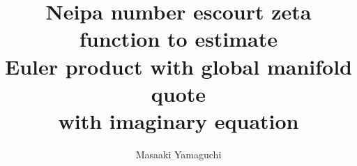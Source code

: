 \documentclass{jsarticle}
\begin{document}
\title{Neipa number escourt zeta function to estimate \\
Euler product with global manifold quote \\
with imaginary equation }
\author{Masaaki Yamaguchi}
\date{}
\maketitle

  \newcommand{\variint}{%
	\begin{picture}(15,30)
		\put(0,0){
			$ \iint $}
		\put(0,5){\line(15,0){15}}
	\end{picture} %
}

\newcommand{\variiint}{%
	\begin{picture}(15,15)
		\put(0,0){
			$ \iiint $}
		\put(0,5){\line(15,0){20}}
	\end{picture} %
}



 \newcommand{\alearletter}{%
	 \begin{picture}(10,20)
		 \put(0,0){
			 $ \square $}
		 \put(0,0){\line(1,1){10}}
	 \end{picture} %
	 }

 \newcommand{\secproduct}{%
	 \begin{picture}(10,20)
		 \put(0,0){
			 $ \nabla $}
		 \put(5,0){+}
	 \end{picture} %
	 }
 \newcommand{\talot}{%
	 \begin{picture}(15,20)
		 \put(0,0){
			 $ \text{\scalebox{2.0}[2]{$\nabla$}}$}
		 \put(5,3){
			 $ \Delta $}
	 \end{picture} %
	 }
 \newcommand{\hazerdnabla}{%
	 \begin{picture}(15,20)
		 \put(0,0){
			 $ \text{\scalebox{2.0}[2]{$\nabla$}}$}
		 \put(5,3){
			 $\text{Y}  $}
	 \end{picture} %
	 }

 \newcommand{\securebox}{%
	 \begin{picture}(15,20)
		 \put(0,0){
			 $ \text{\scalebox{2.0}[2]{$\square$}}$}
		 \put(5,3){
			 $\text{Y}  $}
	 \end{picture} %
	 }


\newcommand{\timebow}{%
	\begin{picture}(5,5)
		\put(0,0){$\text{\rotatebox{90}{$\bowtie$}}$}
	\end{picture} %
	}


 \newcommand{\flowerletter}{%
	 \begin{picture}(10,20)
		 \put(0,0){$\text{\scalebox{1.0}[1]{$\square$}}$}
		 \put(0,0){$\text{\scalebox{1.0}[2]{$\int$}}$}
	 \end{picture} %
	 }
\newcommand{\squareiint}{%
	\begin{picture}(10,20)
		\put(0,0){
			$ \iint $}
		\put(0,4){$\text{\scalebox{3.0}[0.5]{$\square$}}$}
	\end{picture} %
}
\end{document}
